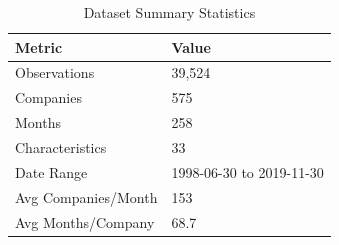 \begin{table}[ht]
\centering
\caption{Dataset Summary Statistics} 
\label{tab:data_summary}
\begin{tabular}{ll}
  \hline
Metric & Value \\ 
  \hline
Observations & 39,524 \\ 
  Companies & 575 \\ 
  Months & 258 \\ 
  Characteristics & 33 \\ 
  Date Range & 1998-06-30 to 2019-11-30 \\ 
  Avg Companies/Month & 153 \\ 
  Avg Months/Company & 68.7 \\ 
   \hline
\end{tabular}
\end{table}
